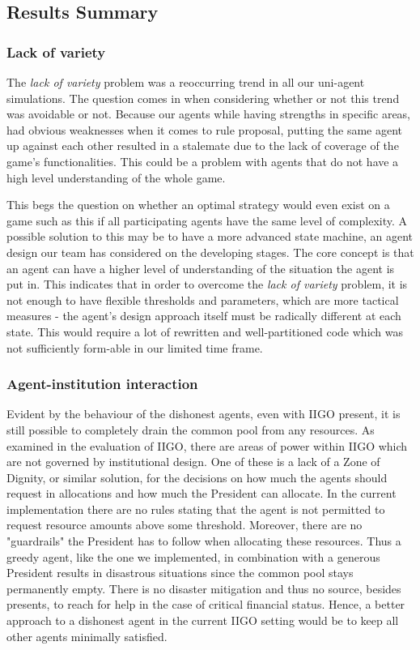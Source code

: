 \subsection{Results Summary} \label{ResultSummary}
\subsubsection{Lack of variety}
The \emph{lack of variety} problem was a reoccurring trend in all our uni-agent simulations. The question comes in when considering whether or not this trend was avoidable or not. Because our agents while having strengths in specific areas, had obvious weaknesses when it comes to rule proposal, putting the same agent up against each other resulted in a stalemate due to the lack of coverage of the game's functionalities. This could be a problem with agents that do not have a high level understanding of the whole game.

This begs the question on whether an optimal strategy would even exist on a game such as this if all participating agents have the same level of complexity. A possible solution to this may be to have a more advanced state machine, an agent design our team has considered on the developing stages. The core concept is that an agent can have a higher level of understanding of the situation the agent is put in. This indicates that in order to overcome the \emph{lack of variety} problem, it is not enough to have flexible thresholds and parameters, which are more tactical measures - the agent's design approach itself must be radically different at each state. This would require a lot of rewritten and well-partitioned code which was not sufficiently form-able in our limited time frame.

\subsubsection{Agent-institution interaction}

Evident by the behaviour of the dishonest agents, even with IIGO present, it is still possible to completely drain the common pool from any resources. As examined in the evaluation of IIGO, there are areas of power within IIGO which are not governed by institutional design. One of these is a lack of a Zone of Dignity, or similar solution, for the decisions on how much the agents should request in allocations and how much the President can allocate. In the current implementation there are no rules stating that the agent is not permitted to request resource amounts above some threshold. Moreover, there are no "guardrails" the President has to follow when allocating these resources. Thus a greedy agent, like the one we implemented, in combination with a generous President results in disastrous situations since the common pool stays permanently empty. There is no disaster mitigation and thus no source, besides presents, to reach for help in the case of critical financial status. Hence, a better approach to a dishonest agent in the current IIGO setting would be to keep all other agents minimally satisfied.

